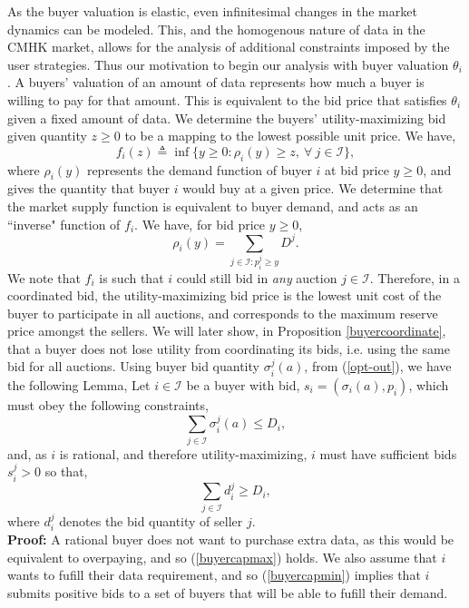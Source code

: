 \documentclass[12pt]{article}
\theoremstyle{definition}
\newcommand{\mcI}{\mathcal{I}}
\newcommand{\g}{\sigma}
\begin{document}
\begin{multicols}{2}
As the buyer valuation is elastic, even infinitesimal changes in the market dynamics can be
modeled. This, and the homogenous nature of data in the CMHK market, 
allows for the analysis of additional constraints imposed by the user
strategies. Thus our motivation to begin our analysis with buyer valuation $\theta_i$.
A buyers' valuation of an amount of data represents how much a buyer is willing
to pay for that amount. 
This is equivalent to the bid price that
satisfies $\theta_i$ given a fixed amount of data. We determine the
buyers' utility-maximizing bid given quantity $z\ge0$ to be a mapping to the lowest
possible unit price. We have,
\begin{equation}\label{buyerinversedemand}
    f_i(z) \triangleq \inf\big\lbrace y\ge 0:
        \rho_i(y) \ge z, \ \forall \ j \in \mcI\big\rbrace,
\end{equation}
where $\rho_i(y)$ represents the demand function of buyer $i$ at bid price
$y\ge 0$, and gives the quantity that buyer $i$ would buy at a given price.
We determine that the market supply function is equivalent to buyer demand, and 
acts as an ``inverse" function of $f_i$. We have, for bid price $y\ge 0$,
\begin{equation}\label{datasupply}
    \rho_i(y) = \sum_{j\in\mcI : p_i^j\ge y} D^j.
\end{equation}
We note that $f_i$ is such that
$i$ could still bid in \emph{any} auction $j\in\mcI$.
Therefore, in a coordinated bid, the utility-maximizing bid price is the
lowest unit cost of the buyer to participate in all auctions, and corresponds to
the maximum reserve price amongst the sellers. We will later show, in Proposition
\ref{buyercoordinate}, that a buyer does not lose utility from coordinating its
bids, i.e. using the same bid for all auctions.
Using buyer bid quantity $\g_i^j(a)$, from (\ref{opt-out}), 
we have the following Lemma,
{
\label{buyerconstraints}
Let $i\in\mcI$ be a buyer with bid, $s_i = (\g_i(a), p_i)$, which must obey
the following constraints,
\begin{equation}\label{buyercapmax}
    \sum_{j\in\mcI} \g^j_i(a) \le D_i,
\end{equation}
and, as $i$ is rational, and therefore utility-maximizing, $i$ must have
sufficient bids $s_i^j > 0$ so that,
\begin{equation}\label{buyercapmin}
    \sum_{j\in\mcI} d^j_i \ge D_i,
\end{equation}
where $d_i^j$ denotes the bid quantity of seller $j$.
}\\
\textbf{Proof:}
A rational buyer does not want to purchase extra data, as this would be
equivalent to overpaying, and so (\ref{buyercapmax}) holds. We also assume that
$i$ wants to fufill their data requirement, and so (\ref{buyercapmin}) implies
that $i$ submits positive bids to a set of buyers that will be able to fufill
their demand.


\end{multicols}
\end{document}
